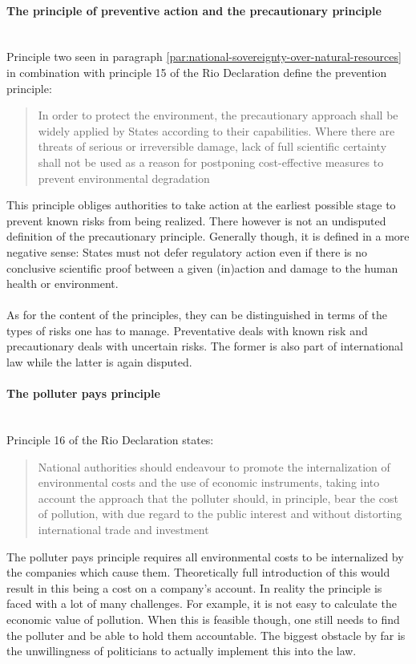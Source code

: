 \documentclass[../summary.tex]{subfiles}
\begin{document}
			\paragraph{The principle of preventive action and the precautionary principle}\mbox{}\\
				Principle two seen in paragraph \ref{par:national-sovereignty-over-natural-resources} in combination with principle 15 of the Rio Declaration define the prevention principle: 
				\begin{quote}
					In order to protect the environment, the precautionary approach shall be widely applied by States according to their capabilities. Where there are threats of serious or irreversible damage, lack of full scientific certainty shall not be used as a reason for postponing cost-effective measures to prevent environmental degradation
				\end{quote}
				This principle obliges authorities to take action at the earliest possible stage to prevent known risks from being realized. There however is not an undisputed definition of the precautionary principle. Generally though, it is defined in a more negative sense: States must not defer regulatory action even if there is no conclusive scientific proof between a given (in)action and damage to the human health or environment.\\
				\\
				As for the content of the principles, they can be distinguished in terms of the types of risks one has to manage. Preventative deals with known risk and precautionary deals with uncertain risks. The former is also part of international law while the latter is again disputed. 
				\newpage
				
			\paragraph{The polluter pays principle}\mbox{}\\
				Principle 16 of the Rio Declaration states:
				\begin{quote}
					National authorities should endeavour to promote the internalization of environmental costs and the use of economic instruments, taking into account the approach that the polluter should, in principle, bear the cost of pollution, with due regard to the public interest and without distorting international trade and investment
				\end{quote}
				The polluter pays principle requires all environmental costs to be internalized by the companies which cause them. Theoretically full introduction of this would result in this being a cost on a company's account. In reality the principle is faced with a lot of many challenges. For example, it is not easy to calculate the economic value of pollution. When this is feasible though, one still  needs to find the polluter and be able to hold them accountable.  The biggest obstacle by far is the unwillingness of politicians to actually implement this into the law.
				
\end{document}
